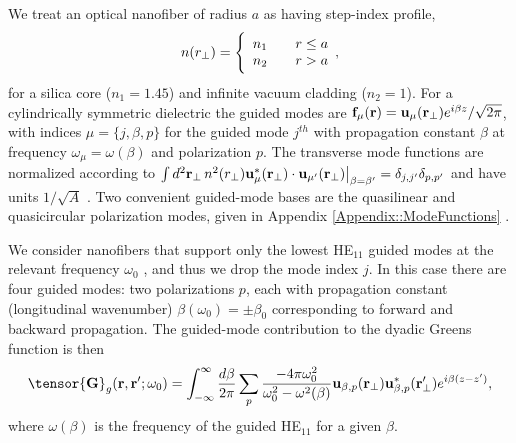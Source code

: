 \documentclass[preprint, aps,pra,onecolumn]{revtex4-1} %
\begin{document}
We treat an optical nanofiber of radius $a$ as having step-index profile,
	\begin{align} \label{Eq::IndexofRefraction}
		n(r_\perp) = \Bigg\{  
			\begin{array}{l l} n_1 & \quad r \leq a \\
						 n_2 & \quad r > a 
		\end{array},
	\end{align}
for a silica core ($n_1 = 1.45$) and infinite vacuum cladding ($n_2 = 1$).  For a cylindrically symmetric dielectric the guided modes are {\color{blue}  $\mathbf{f}_\mu (\mathbf{r}) = \mathbf{u}_\mu (\mathbf{r}_\perp) e^{i\beta z}/\sqrt{2 \pi}$}, with indices $\mu=\{j, \beta , p\}$ for the guided mode $j^{th}$ with propagation constant $\beta$ {\color{blue} at frequency $\omega_\mu=\omega(\beta)$} and polarization $p$.  The transverse mode functions are normalized according to $\int d^2 \mathbf{r}_\perp \, n^2(r_\perp)\mathbf{u}^*_\mu (\mathbf{r}_\perp) \cdot \mathbf{u}_{\mu'} (\mathbf{r}_\perp)\big|_{\beta = \beta'} = \delta_{j,j'}\delta_{p,p'}$ and have units $1/\sqrt{A}$ \cite{le_kien_anisotropy_2014}.  Two convenient guided-mode bases are the quasilinear and quasicircular polarization modes, given in  Appendix \ref{Appendix::ModeFunctions} \cite{kien_field_2004}.  

We consider nanofibers that support only the lowest HE$_{11}$ guided modes at the relevant frequency $\omega_0$ \cite{snyder_optical_1983}, and thus we drop the mode index $j$.  In this case there are four guided modes: two polarizations $p$, each with propagation constant (longitudinal wavenumber) $\beta(\omega_0) = \pm\beta_0$ corresponding to forward and backward propagation.  The guided-mode contribution to the dyadic Greens function is then 
	\begin{equation} \label{Eq::GreensEigenmodes}
		\tensor{\mathbf{G}}_g(\br,\br'; \omega_0) = \int_{-\infty}^\infty \frac{d \beta}{2 \pi} \sum_{p} 
\frac{-4\pi\omega_0^2}{\omega_0^2-\omega^2(\beta)} \mathbf{u}_{\beta,p} (\br_\perp)\mathbf{u}^*_{\beta,p} 
(\br_{\perp}^\prime) e^{i\beta(z-z')},
	\end{equation}
where $ \omega(\beta)$ is the frequency of the guided HE$_{11}$ for a given $\beta$.  
\end{document}
